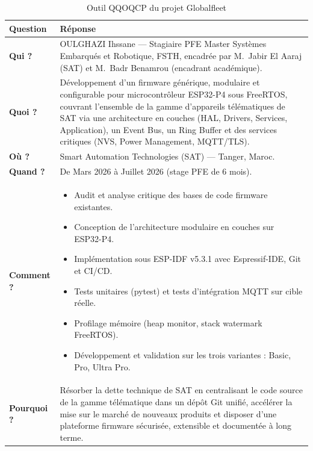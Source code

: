 \begin{table}[H]
    \centering
    \renewcommand{\arraystretch}{1.6}
    \caption{Outil QQOQCP du projet Globalfleet}
    \label{tab:qqoqcp}
    \begin{tabular}{|p{2cm}|p{10.5cm}|}
        \hline
        \rowcolor{gray!20}
        \textbf{Question} & \textbf{Réponse} \\
        \hline
        \textbf{Qui ?} &
        OULGHAZI Ihssane --- Stagiaire PFE Master Systèmes Embarqués
        et Robotique, FSTH, encadrée par M.~Jabir El Aaraj (SAT) et
        M.~Badr Benamrou (encadrant académique). \\
        \hline
        \textbf{Quoi ?} &
        Développement d'un firmware générique, modulaire et
        configurable pour microcontrôleur ESP32-P4 sous FreeRTOS,
        couvrant l'ensemble de la gamme d'appareils télématiques
        de SAT via une architecture en couches (HAL, Drivers,
        Services, Application), un Event Bus, un Ring Buffer et
        des services critiques (NVS, Power Management, MQTT/TLS). \\
        \hline
        \textbf{Où ?} &
        Smart Automation Technologies (SAT) --- Tanger, Maroc. \\
        \hline
        \textbf{Quand ?} &
        De Mars 2026 à Juillet 2026 (stage PFE de 6 mois). \\
        \hline
        \textbf{Comment ?} &
        \begin{itemize}[noitemsep, topsep=0pt, leftmargin=*]
            \item Audit et analyse critique des bases de code
                  firmware existantes.
            \item Conception de l'architecture modulaire en couches
                  sur ESP32-P4.
            \item Implémentation sous ESP-IDF v5.3.1 avec
                  Espressif-IDE, Git et CI/CD.
            \item Tests unitaires (pytest) et tests d'intégration
                  MQTT sur cible réelle.
            \item Profilage mémoire (heap monitor, stack watermark
                  FreeRTOS).
            \item Développement et validation sur les trois
                  variantes : Basic, Pro, Ultra Pro.
        \end{itemize} \\
        \hline
        \textbf{Pourquoi ?} &
        Résorber la dette technique de SAT en centralisant le code
        source de la gamme télématique dans un dépôt Git unifié,
        accélérer la mise sur le marché de nouveaux produits et
        disposer d'une plateforme firmware sécurisée, extensible
        et documentée à long terme. \\
        \hline
    \end{tabular}
\end{table}


